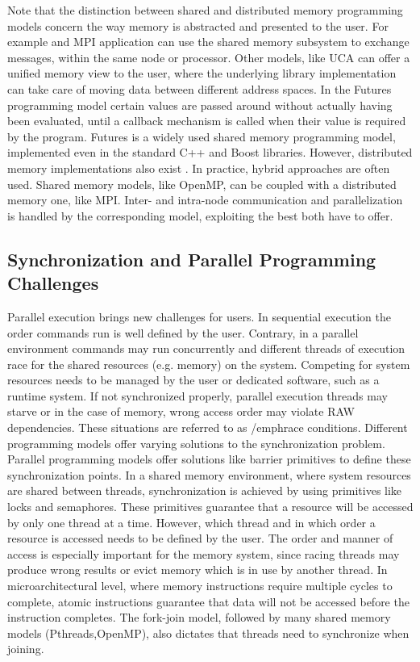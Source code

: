 Note that the distinction between shared and distributed memory programming models concern
the way memory is abstracted and presented to the user.  For example and MPI application
can use the shared memory subsystem to exchange messages, within the same node or
processor.  Other models, like UCA \cite{El-Ghazawi:2006:UUP:1188455.1188483} can offer a
unified memory view to the user, where the underlying library implementation can take care
of moving data between different address spaces.  In the Futures programming model certain
values are passed around without actually having been evaluated, until a callback
mechanism is called when their value is required by the program.  Futures is a widely used
shared memory programming model, implemented even in the standard C++ and Boost
\cite{Schling:2011:BCL:2049814} libraries.  However, distributed memory implementations
also exist \cite{Reinders:2007:ITB:1461409,DFChasapis}.  In practice, hybrid approaches
are often used.  Shared memory models, like OpenMP, can be coupled with a distributed
memory one, like MPI.  Inter- and intra-node communication and parallelization is handled
by the corresponding model, exploiting the best both have to offer.

\subsection{Synchronization and Parallel Programming Challenges}
\label{sec:par_prog_challenges}

Parallel execution brings new challenges for users.  In sequential execution the order
commands run is well defined by the user.  Contrary, in a parallel environment commands
may run concurrently and different threads of execution race for the shared resources
(e.g. memory) on the system.  Competing for system resources needs to be managed by the
user or dedicated software, such as a runtime system.  If not synchronized properly,
parallel execution threads may starve or in the case of memory, wrong access order may
violate RAW dependencies.  These situations are referred to as /emph{race conditions}.
Different programming models offer varying solutions to the synchronization problem.
Parallel programming models offer solutions like barrier primitives to define these
synchronization points.  In a shared memory environment, where system resources are shared
between threads, synchronization is achieved by using primitives like locks and
semaphores.  These primitives guarantee that a resource will be accessed by only one
thread at a time.  However, which thread and in which order a resource is accessed needs
to be defined by the user.  The order and manner of access is especially important for the
memory system, since racing threads may produce wrong results or evict memory which is in
use by another thread.  In microarchitectural level, where memory instructions require
multiple cycles to complete, atomic instructions guarantee that data will not be accessed
before the instruction completes.  The fork-join model, followed by many shared memory
models (Pthreads,OpenMP), also dictates that threads need to synchronize when joining.  

